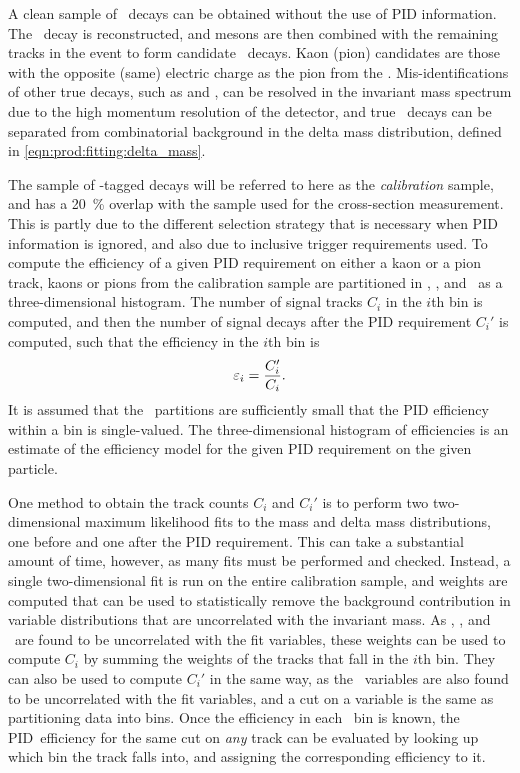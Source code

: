 A clean sample of \DzToKpi\ decays can be obtained without the use of \ac{PID} 
information.
The \DzToKpi\ decay is reconstructed, and \PDzero mesons are then combined with 
the remaining tracks in the event to form candidate \DstToDzpi\ decays.
Kaon (pion) candidates are those with the opposite (same) electric charge as 
the pion from the \PDstarp.
Mis-identifications of other true \PDzero decays, such as 
\decay{\PDzero}{\Ppiplus\Ppiminus} and \decay{\PDzero}{\PKplus\PKminus}, can be 
resolved in the \PDzero invariant mass spectrum due to the high momentum 
resolution of the detector, and true \PDstarp\ decays can be separated from 
combinatorial background in the delta mass distribution, defined in 
\cref{eqn:prod:fitting:delta_mass}.

The sample of \PDstarp-tagged \PDzero decays will be referred to here as the 
\emph{calibration} sample, and has a \SI{20}{\percent} overlap with the sample 
used for the cross-section measurement.
This is partly due to the different selection strategy that is necessary when 
\ac{PID} information is ignored, and also due to inclusive trigger requirements 
used.
To compute the efficiency of a given \ac{PID} requirement on either a kaon or a 
pion track, kaons or pions from the calibration sample are partitioned in 
\ptot, \Eta, and \nspd\ as a three-dimensional histogram.
The number of signal tracks $C_{i}$ in the $i$th bin is computed, and then the 
number of signal decays after the \ac{PID} requirement $C_{i}'$ is computed, 
such that the efficiency in the $i$th bin is
\begin{equation}
  \varepsilon_{i} = \frac{C_{i}'}{C_{i}}.
\end{equation}
It is assumed that the \ptotetanspd\ partitions are sufficiently small that the 
\ac{PID} efficiency within a bin is single-valued.
The three-dimensional histogram of efficiencies is an estimate of the 
efficiency model for the given \ac{PID} requirement on the given particle.

One method to obtain the track counts $C_{i}$ and $C_{i}'$ is to perform two 
two-dimensional maximum likelihood fits to the \PDzero mass and delta mass 
distributions, one before and one after the \ac{PID} requirement.
This can take a substantial amount of time, however, as many fits must be 
performed and checked.
Instead, a single two-dimensional fit is run on the entire calibration sample, 
and weights are computed that can be used to statistically remove the 
background contribution in variable distributions that are uncorrelated with 
the invariant mass.\footnotemark
As \ptot, \Eta, and \nspd\ are found to be uncorrelated with the fit variables, 
these weights can be used to compute $C_{i}$ by summing the weights of the 
tracks that fall in the $i$th bin.
They can also be used to compute $C_{i}'$ in the same way, as the \dll\ 
variables are also found to be uncorrelated with the fit variables, and a cut 
on a variable is the same as partitioning data into bins.
Once the efficiency in each \ptotetanspd\ bin is known, the \ac{PID}\ 
efficiency for the same cut on \emph{any} track can be evaluated by looking up 
which bin the track falls into, and assigning the corresponding efficiency to 
it.

